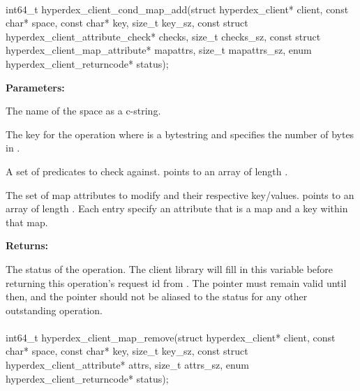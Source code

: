 \paragraph{}
\begin{ccode}
int64_t hyperdex_client_cond_map_add(struct hyperdex_client* client,
                const char* space,
                const char* key, size_t key_sz,
                const struct hyperdex_client_attribute_check* checks, size_t checks_sz,
                const struct hyperdex_client_map_attribute* mapattrs, size_t mapattrs_sz,
                enum hyperdex_client_returncode* status);
\end{ccode}
\funcdesc 

\noindent\textbf{Parameters:}
\begin{description}[labelindent=\widthof{{\code{mapattrs}, \code{mapattrs\_sz}}},leftmargin=*,noitemsep,nolistsep,align=right]
\item[\code{space}] The name of the space as a c-string.
\item[\code{key}, \code{key\_sz}] The key for the operation where  is a bytestring and  specifies the number of bytes in .
\item[\code{checks}, \code{checks\_sz}] A set of predicates to check against.   points to an array of length .
\item[\code{mapattrs}, \code{mapattrs\_sz}] The set of map attributes to modify and their respective key/values.   points to an array of length .  Each entry specify an attribute that is a map and a key within that map.
\end{description}

\noindent\textbf{Returns:}
\begin{description}[labelindent=\widthof{{\code{status}}},leftmargin=*,noitemsep,nolistsep,align=right]
\item[\code{status}] The status of the operation.  The client library will fill in this variable before returning this operation's request id from .  The pointer must remain valid until then, and the pointer should not be aliased to the status for any other outstanding operation.
\end{description}

\paragraph{}
\begin{ccode}
int64_t hyperdex_client_map_remove(struct hyperdex_client* client,
                const char* space,
                const char* key, size_t key_sz,
                const struct hyperdex_client_attribute* attrs, size_t attrs_sz,
                enum hyperdex_client_returncode* status);
\end{ccode}
\funcdesc 


